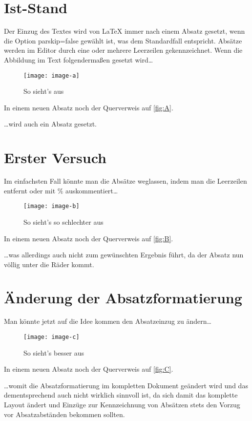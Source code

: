 \documentclass[english,ngerman]{tudscrartcl}
\newcommand*\ignorefloats{%
  \renewenvironment{figure}[1][]{}{}%
  \renewenvironment{table}[1][]{}{}%
  \renewcommand*\caption[1]{}%
  \renewcommand*\label[1]{}%
}
\begin{document}
\section{Ist-Stand}
Der Einzug des Textes wird von LaTeX immer nach einem Absatz gesetzt, wenn die 
Option parskip=false gewählt ist, was dem Standardfall entspricht. Absätze 
werden im Editor durch eine oder mehrere Leerzeilen gekennzeichnet. Wenn die 
Abbildung im Text folgendermaßen gesetzt wird\dots
%
\InputHook{\ignorefloats}
\begin{Excerpt}
\blindtext

\begin{figure}[h]
\centering
\texttt{[image: image-a]}
\caption{So sieht's aus}
\label{fig:A}
\end{figure}

\blindtext

In einem neuen Absatz noch der Querverweis auf \autoref{fig:A}.
\end{Excerpt}
%
\dots wird auch ein Absatz gesetzt.

\clearpage
\section{Erster Versuch}
Im einfachsten Fall könnte man die Absätze weglassen, indem man die Leerzeilen 
entfernt oder mit \% auskommentiert\dots
%
\InputHook{\ignorefloats}
\begin{Excerpt}
\blindtext
%
\begin{figure}[h]
\centering
\texttt{[image: image-b]}
\caption{So sieht's so schlechter aus}
\label{fig:B}
\end{figure}
%
\blindtext

In einem neuen Absatz noch der Querverweis auf \autoref{fig:B}.
\end{Excerpt}
%
\dots was allerdings auch nicht zum gewünschten Ergebnis führt, da der Absatz 
nun völlig unter die Räder kommt.

\clearpage
\section{Änderung der Absatzformatierung}
Man könnte jetzt auf die Idee kommen den Absatzeinzug zu ändern\dots
%
\InputHook{\ignorefloats}
\begin{Excerpt}
\blindtext

\begin{figure}[h]
\centering
\texttt{[image: image-c]}
\caption{So sieht's besser aus}
\label{fig:C}
\end{figure}

\blindtext

In einem neuen Absatz noch der Querverweis auf \autoref{fig:C}.
\end{Excerpt}
%
\enlargethispage{\baselineskip}%
\dots womit die Absatzformatierung im kompletten Dokument geändert wird und das
dementsprechend auch nicht wirklich sinnvoll ist, da sich damit das komplette 
Layout ändert und Einzüge zur Kennzeichnung von Absätzen stets den Vorzug vor 
Absatzabständen bekommen sollten.
\end{document}
